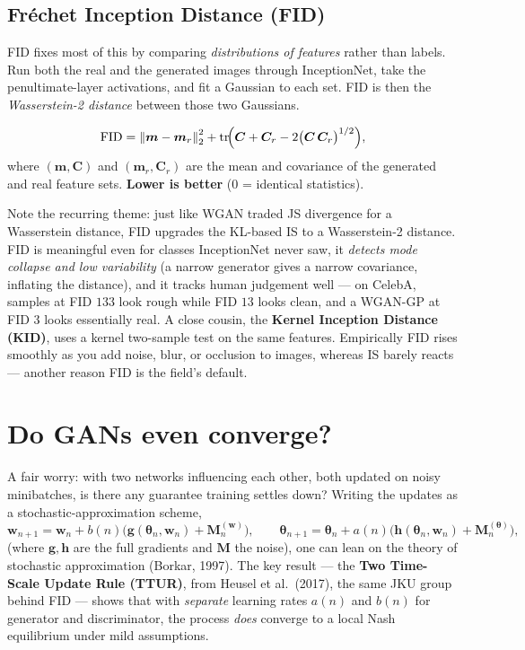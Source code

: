 \documentclass[11pt, oneside]{book}
\newcommand{\norm}[1]{\left\lVert #1 \right\rVert}
\newcommand{\tr}{\operatorname{tr}}
\newcommand{\params}{\boldsymbol{\theta}}
\newcommand{\weights}{\mathbf{w}}
\begin{document}
\subsection{Fréchet Inception Distance (FID)}

FID fixes most of this by comparing \emph{distributions of features} rather than
labels. Run both the real and the generated images through InceptionNet, take the
penultimate-layer activations, and fit a Gaussian to each set. FID is then the
\emph{Wasserstein-2 distance} between those two Gaussians.

\begin{thmbox}[title={Fréchet Inception Distance}]
\[
  \mathrm{FID} = \norm{\boldsymbol{m} - \boldsymbol{m}_r}_2^2
  + \tr\!\Bigl(\boldsymbol{C} + \boldsymbol{C}_r
      - 2\bigl(\boldsymbol{C}\,\boldsymbol{C}_r\bigr)^{1/2}\Bigr),
\]
where $(\boldsymbol{m},\boldsymbol{C})$ and $(\boldsymbol{m}_r,\boldsymbol{C}_r)$
are the mean and covariance of the generated and real feature sets. \textbf{Lower
is better} ($0$ = identical statistics).
\end{thmbox}

Note the recurring theme: just like WGAN traded JS divergence for a Wasserstein
distance, FID upgrades the KL-based IS to a Wasserstein-2 distance. FID is
meaningful even for classes InceptionNet never saw, it \emph{detects mode collapse
and low variability} (a narrow generator gives a narrow covariance, inflating the
distance), and it tracks human judgement well --- on CelebA, samples at FID $133$
look rough while FID $13$ looks clean, and a WGAN-GP at FID $3$ looks essentially
real. A close cousin, the \textbf{Kernel Inception Distance (KID)}, uses a kernel
two-sample test on the same features. Empirically FID rises smoothly as you add
noise, blur, or occlusion to images, whereas IS barely reacts --- another reason
FID is the field's default.

\section{Do GANs even converge?}

A fair worry: with two networks influencing each other, both updated on noisy
minibatches, is there any guarantee training settles down? Writing the updates as
a stochastic-approximation scheme,
\[
  \weights_{n+1} = \weights_n + b(n)\bigl(\boldsymbol{g}(\params_n,\weights_n) + \boldsymbol{M}^{(\weights)}_n\bigr),
  \qquad
  \params_{n+1} = \params_n + a(n)\bigl(\boldsymbol{h}(\params_n,\weights_n) + \boldsymbol{M}^{(\params)}_n\bigr),
\]
(where $\boldsymbol{g},\boldsymbol{h}$ are the full gradients and
$\boldsymbol{M}$ the noise), one can lean on the theory of
stochastic approximation (Borkar, 1997). The key result --- the
\textbf{Two Time-Scale Update Rule (TTUR)}, from Heusel et al.\ (2017), the same
JKU group behind FID --- shows that with \emph{separate} learning rates $a(n)$ and
$b(n)$ for generator and discriminator, the process \emph{does} converge to a local
Nash equilibrium under mild assumptions.
\end{document}
